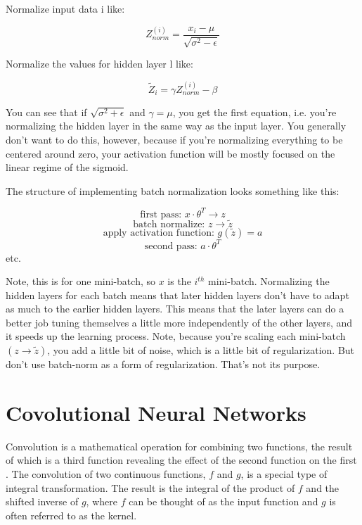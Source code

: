 Normalize input data i like:


\begin{equation}
    Z_{norm}^{(i)} = \frac{x_i-\mu}{\sqrt{\sigma^2-\epsilon}}
\end{equation}


Normalize the values for hidden layer l like:

\begin{equation}
\widetilde{Z}_i = \gamma Z_{norm}^{(i)} - \beta
\end{equation}

You can see that if $\sqrt{\sigma^2 + \epsilon}$ and $\gamma = \mu$, you get the first equation, i.e. you're normalizing the hidden layer in the same way as the input layer. You generally don't want to do this, however, because if you're normalizing everything to be centered around zero, your activation function will be mostly focused on the linear regime of the sigmoid.

The structure of implementing batch normalization looks something like this:

$$\text{first pass: } x \cdot \theta^T \rightarrow z$$
$$\text{batch normalize: } z \rightarrow \widetilde{z}$$ 
$$\text{apply activation function: } g(\widetilde{z}) = a$$
$$\text{second pass: } a \cdot \theta^T$$     
etc.

Note, this is for one mini-batch, so $x$ is the $i^{th}$ mini-batch. Normalizing the hidden layers for each batch means that later hidden layers don't have to adapt as much to the earlier hidden layers. This means that the later layers can do a better job tuning themselves a little more independently of the other layers, and it speeds up the learning process. Note, because you're scaling each mini-batch $(z \rightarrow \widetilde{z})$, you add a little bit of noise, which is a little bit of regularization. But don't use batch-norm as a form of regularization. That's not its purpose.

\section{Covolutional Neural Networks}
Convolution is a mathematical operation for combining two functions, the result of which is a third function revealing the effect of the second function on the first \cite{Boas-mathmethods}. The convolution of two continuous functions, $ f $ and $ g $, is a special type of integral transformation. The result is the integral of the product of $ f $ and the shifted inverse of $ g $, where $ f $ can be thought of as the input function and $ g $ is often referred to as the kernel.

